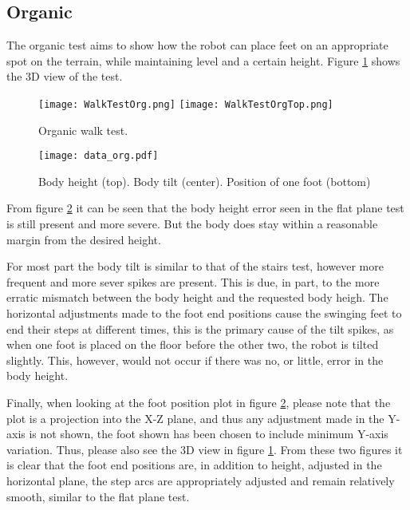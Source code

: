     \subsection{Organic}
    The organic test aims to show how the robot can place feet on an appropriate spot on the terrain, while maintaining level and a certain height. Figure \ref{fig:org_test} shows the
    3D view of the test.
    \begin{figure}[h]
        \centering
        \texttt{[image: WalkTestOrg.png]}
        \texttt{[image: WalkTestOrgTop.png]}
        \caption{Organic walk test.}
        \label{fig:org_test}
    \end{figure}
    \begin{figure}[h]
        \centering
        \texttt{[image: data\_org.pdf]}
        \caption{Body height (top). Body tilt (center). Position of one foot (bottom)}
        \label{fig:org_test_data}
    \end{figure}

    From figure \ref{fig:org_test_data} it can be seen that the body height error seen in the flat plane test
    is still present and more severe. But the body does stay within a reasonable margin from the desired height.

    For most part the body tilt is similar to that of the stairs test, however more frequent and more sever spikes are present.
    This is due, in part, to the more erratic mismatch between the body height and the requested body heigh. The horizontal adjustments made to 
    the foot end positions cause the swinging feet to end their steps at different times, this is the primary cause of the tilt spikes, as when one
    foot is placed on the floor before the other two, the robot is tilted slightly. This, however, would not occur if there was no, or little, 
    error in the body height.

    Finally, when looking at the foot position plot in figure \ref{fig:org_test_data}, please note that the plot is a projection into the X-Z plane, and thus any
    adjustment made in the Y-axis is not shown, the foot shown has been chosen to include minimum Y-axis variation. 
    Thus, please also see the 3D view in figure \ref{fig:org_test}. From these two figures it is clear that the foot end positions are, in addition to height,
    adjusted in the horizontal plane, the step arcs are appropriately adjusted and remain relatively smooth, similar to the flat plane test.
